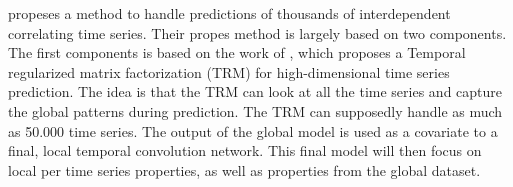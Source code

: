 \cite{Sen2019} propeses a method to handle predictions of thousands of interdependent correlating time series.
Their propes method is largely based on two components. The first components is based on the work of
\cite{Yu}, which proposes a Temporal regularized matrix factorization (TRM) for high-dimensional time series prediction.
The idea is that the TRM can look at all the time series and capture the global patterns during prediction.
The TRM can supposedly handle as much as 50.000 time series.
The output of the global model is used as a covariate to a final, local temporal convolution network. This final model
will then focus on local per time series properties, as well as properties from the global dataset.





%
